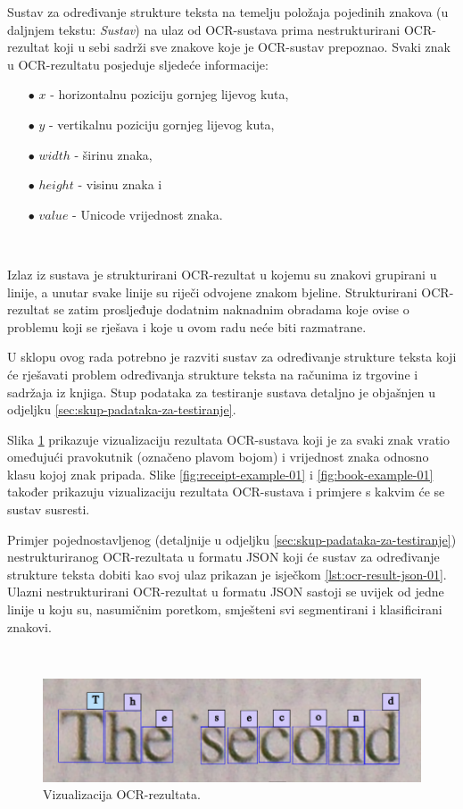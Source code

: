 \documentclass[times, utf8, zavrsni]{fer}
\begin{document}
Sustav za određivanje strukture teksta na temelju položaja pojedinih znakova
(u daljnjem tekstu: \emph{Sustav}) na ulaz od OCR-sustava prima
nestrukturirani OCR-rezultat koji u sebi sadrži sve znakove koje je OCR-sustav
prepoznao. Svaki znak u OCR-rezultatu posjeduje sljedeće informacije:
\begin{itemize}
    \item[$\bullet$] $x$ - horizontalnu poziciju gornjeg lijevog kuta,
    \item[$\bullet$] $y$ - vertikalnu poziciju gornjeg lijevog kuta,
    \item[$\bullet$] $width$ - širinu znaka,
    \item[$\bullet$] $height$ - visinu znaka i
    \item[$\bullet$] $value$ - Unicode vrijednost znaka.
\end{itemize}

\

Izlaz iz sustava je strukturirani OCR-rezultat u kojemu su znakovi
grupirani u linije, a unutar svake linije su riječi odvojene znakom
bjeline. Strukturirani OCR-rezultat se zatim prosljeđuje dodatnim naknadnim
obradama koje ovise o problemu koji se rješava i koje u ovom radu neće biti
razmatrane.

U sklopu ovog rada potrebno je razviti sustav za određivanje strukture
teksta koji će rješavati problem određivanja strukture teksta na računima iz
trgovine i sadržaja iz knjiga. Stup podataka za testiranje
sustava detaljno je objašnjen u odjeljku \ref{sec:skup-padataka-za-testiranje}.

Slika \ref{fig:book-example-02} prikazuje vizualizaciju rezultata OCR-sustava
koji je za svaki znak vratio omeđujući pravokutnik (označeno plavom bojom) i
vrijednost znaka odnosno klasu kojoj znak pripada.
Slike \ref{fig:receipt-example-01} i \ref{fig:book-example-01} također prikazuju
vizualizaciju rezultata OCR-sustava i primjere s kakvim će se sustav susresti.

Primjer pojednostavljenog (detaljnije u odjeljku
\ref{sec:skup-padataka-za-testiranje}) nestrukturiranog OCR-rezultata u formatu
JSON koji će sustav za određivanje strukture teksta dobiti kao svoj ulaz
prikazan je isječkom \ref{lst:ocr-result-json-01}. Ulazni nestrukturirani
OCR-rezultat u formatu JSON sastoji se uvijek od jedne linije u koju
su, nasumičnim poretkom, smješteni svi segmentirani i klasificirani znakovi.

\

\begin{figure}[htb]
    \centering
    \includegraphics[width=\textwidth]{images/book-example-02.png}
    \caption{Vizualizacija OCR-rezultata.}
    \label{fig:book-example-02}
\end{figure}
\end{document}
